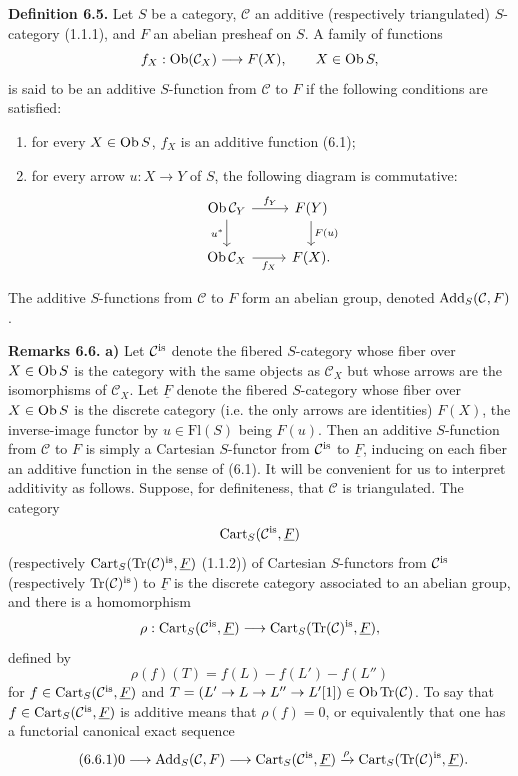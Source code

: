 \documentclass[11pt]{article}
\begin{document}
\textbf{Definition 6.5.} Let \(S\) be a category, \(\mathcal C\) an additive (respectively triangulated) \(S\)-category (1.1.1), and \(F\) an abelian presheaf on \(S\). A family of functions
\[
  f_X:\operatorname{Ob}(\mathcal C_X)\longrightarrow F(X),
  \qquad X\in\operatorname{Ob} S,
\]
is said to be an additive \(S\)-function from \(\mathcal C\) to \(F\) if the following conditions are satisfied:
\begin{enumerate}[label=(\roman*)]
\item for every \(X\in\operatorname{Ob} S\), \(f_X\) is an additive function (6.1);
\item for every arrow \(u:X\to Y\) of \(S\), the following diagram is commutative:
\[
\begin{tikzcd}
\Ob\mathcal C_Y \arrow[r,"f_Y"] \arrow[d,"u^*"'] & F(Y) \arrow[d,"F(u)"]\\
\Ob\mathcal C_X \arrow[r,"f_X"'] & F(X).
\end{tikzcd}
\]
\end{enumerate}
The additive \(S\)-functions from \(\mathcal C\) to \(F\) form an abelian group, denoted \(\operatorname{Add}_S(\mathcal C,F)\).

\textbf{Remarks 6.6.} \textbf{a)} Let \(\mathcal C^{\mathrm{is}}\) denote the fibered \(S\)-category whose fiber over \(X\in\operatorname{Ob} S\) is the category with the same objects as \(\mathcal C_X\) but whose arrows are the isomorphisms of \(\mathcal C_X\). Let \(\underline F\) denote the fibered \(S\)-category whose fiber over \(X\in\operatorname{Ob} S\) is the discrete category (i.e. the only arrows are identities) \(F(X)\), the inverse-image functor by \(u\in\mathrm{Fl}(S)\) being \(F(u)\). Then an additive \(S\)-function from \(\mathcal C\) to \(F\) is simply a Cartesian \(S\)-functor from \(\mathcal C^{\mathrm{is}}\) to \(\underline F\), inducing on each fiber an additive function in the sense of (6.1). It will be convenient for us to interpret additivity as follows. Suppose, for definiteness, that \(\mathcal C\) is triangulated. The category
\[
  \operatorname{Cart}_S(\mathcal C^{\mathrm{is}},\underline F)
\]
(respectively \(\operatorname{Cart}_S(\operatorname{Tr}(\mathcal C)^{\mathrm{is}},\underline F)\) (1.1.2)) of Cartesian \(S\)-functors from \(\mathcal C^{\mathrm{is}}\) (respectively \(\operatorname{Tr}(\mathcal C)^{\mathrm{is}}\)) to \(\underline F\) is the discrete category associated to an abelian group, and there is a homomorphism
\[
  \rho:\operatorname{Cart}_S(\mathcal C^{\mathrm{is}},\underline F)
  \longrightarrow
  \operatorname{Cart}_S(\operatorname{Tr}(\mathcal C)^{\mathrm{is}},\underline F),
\]
defined by
\[
  \rho(f)(T)=f(L)-f(L')-f(L'')
\]
for \(f\in\operatorname{Cart}_S(\mathcal C^{\mathrm{is}},\underline F)\) and \(T=(L'\to L\to L''\to L'[1])\in\operatorname{Ob}\operatorname{Tr}(\mathcal C)\). To say that \(f\in\operatorname{Cart}_S(\mathcal C^{\mathrm{is}},\underline F)\) is additive means that \(\rho(f)=0\), or equivalently that one has a functorial canonical exact sequence
\begin{equation}\tag{6.6.1}
  0\longrightarrow \operatorname{Add}_S(\mathcal C,F)
  \longrightarrow \operatorname{Cart}_S(\mathcal C^{\mathrm{is}},\underline F)
  \xrightarrow{\rho}
  \operatorname{Cart}_S(\operatorname{Tr}(\mathcal C)^{\mathrm{is}},\underline F).
\end{equation}
\end{document}
